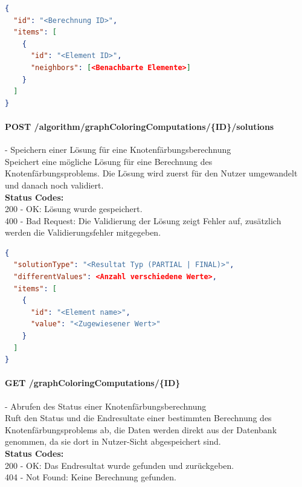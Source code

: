 \begin{lstlisting}[language=JSON, caption=Beispiel für Eingabedaten des Knotenfärbungsproblems für den Algorithmus, label=lst:input_graphcoloring_algo]  
{
  "id": "<Berechnung ID>",
  "items": [
    {
      "id": "<Element ID>",
      "neighbors": [<Benachbarte Elemente>]
    }
  ]
}
\end{lstlisting}

\paragraph{POST /algorithm/graphColoringComputations/\{ID\}/solutions} - Speichern einer Lösung für eine Knotenfärbungsberechnung\mbox{}\\
Speichert eine mögliche Lösung für eine Berechnung des Knotenfärbungsproblems. Die Lösung wird zuerst für den Nutzer umgewandelt und danach noch validiert.\\
\textbf{Status Codes:}\\
200 - OK: Lösung wurde gespeichert.\\
400 - Bad Request: Die Validierung der Lösung zeigt Fehler auf, zusätzlich werden die Validierungsfehler mitgegeben.\\

\begin{lstlisting}[language=JSON, caption=Beispiel eines Resultates für das Knotenfärbungsproblems aus Algorithmus-Sicht, label=lst:solution_graphcoloring_algo]  
{
  "solutionType": "<Resultat Typ (PARTIAL | FINAL)>",
  "differentValues": <Anzahl verschiedene Werte>,
  "items": [
    {
      "id": "<Element name>",
      "value": "<Zugewiesener Wert>"
    }
  ]
}
\end{lstlisting}

\paragraph{GET /graphColoringComputations/\{ID\}} - Abrufen des Status einer Knotenfärbungsberechnung\mbox{}\\
Ruft den Status und die Endresultate einer bestimmten Berechnung des Knotenfärbungsproblems ab, die Daten werden direkt aus der Datenbank genommen, da sie dort in Nutzer-Sicht abgespeichert sind.\\
\textbf{Status Codes:}\\
200 - OK: Das Endresultat wurde gefunden und zurückgeben.\\
404 - Not Found: Keine Berechnung gefunden.\\

